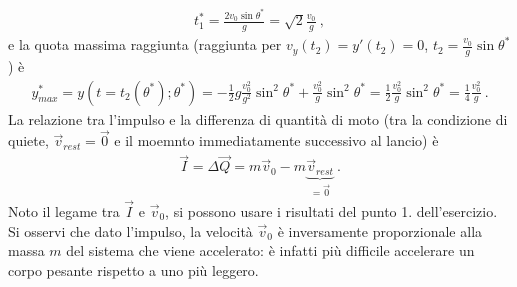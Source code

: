 \documentclass[letterpaper,10pt,italian]{jupyterBook}
\begin{document}
\begin{equation*}
\begin{split}t_1^* = \frac{2 v_0 \sin \theta^*}{g} = \sqrt{2} \frac{v_0}{g} \ ,\end{split}
\end{equation*}
\sphinxAtStartPar
e la quota massima raggiunta (raggiunta per \(v_y(t_2) = y'(t_2) = 0\), \(t_2 = \frac{v_0}{g} \sin \theta^*\)) è
\begin{equation*}
\begin{split}y_{max}^* = y\left(t=t_2(\theta^*); \theta^* \right) = -\frac{1}{2} g \frac{v_0^2}{g^2} \sin^2 \theta^* + \frac{v_0^2}{g} \sin^2 \theta^* = 
\frac{1}{2} \frac{v_0^2}{g} \sin^2 \theta^* = \frac{1}{4} \frac{v_0^2}{g} \ .\end{split}
\end{equation*}
\sphinxAtStartPar
{} La relazione tra l’impulso e la differenza di quantità di moto (tra la condizione di quiete, \(\vec{v}_{rest} = \vec{0}\) e il moemnto immediatamente successivo al lancio) è
\begin{equation*}
\begin{split}\vec{I} = \Delta \vec{Q} = m \vec{v}_0 - m \underbrace{\vec{v}_{rest}}_{= \vec{0}} \ .\end{split}
\end{equation*}
\sphinxAtStartPar
Noto il legame tra \(\vec{I}\) e \(\vec{v}_0\), si possono usare i risultati del punto 1. dell’esercizio. Si osservi che dato l’impulso, la velocità \(\vec{v}_0\) è inversamente proporzionale alla massa \(m\) del sistema che viene accelerato: è infatti più difficile accelerare un corpo pesante rispetto a uno più leggero.
\end{document}
